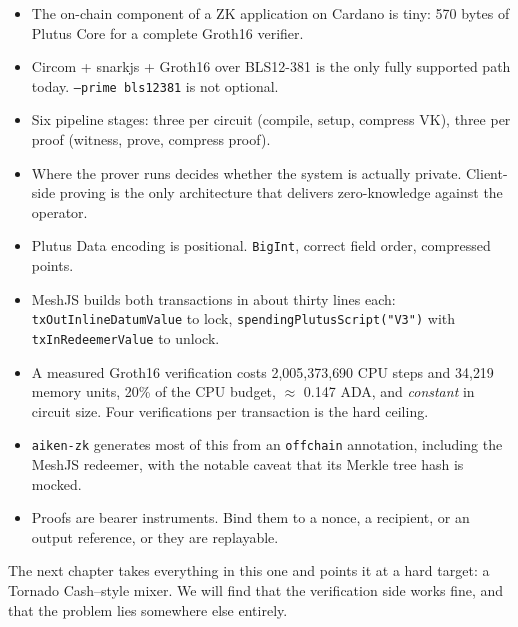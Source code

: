 \begin{itemize}
  \item The on-chain component of a ZK application on Cardano is tiny: 570
        bytes of Plutus Core for a complete Groth16 verifier.
  \item Circom + snarkjs + Groth16 over BLS12-381 is the only fully supported
        path today. \texttt{--prime bls12381} is not optional.
  \item Six pipeline stages: three per circuit (compile, setup, compress VK),
        three per proof (witness, prove, compress proof).
  \item Where the prover runs decides whether the system is actually private.
        Client-side proving is the only architecture that delivers
        zero-knowledge against the operator.
  \item Plutus Data encoding is positional. \texttt{BigInt}, correct field
        order, compressed points.
  \item MeshJS builds both transactions in about thirty lines each:
        \texttt{txOutInlineDatumValue} to lock,
        \texttt{spendingPlutusScript("V3")} with
        \texttt{txInRedeemerValue} to unlock.
  \item A measured Groth16 verification costs 2{,}005{,}373{,}690 CPU steps and
        34{,}219 memory units, 20\% of the CPU budget, $\approx$ 0.147 ADA,
        and \emph{constant} in circuit size. Four verifications per transaction
        is the hard ceiling.
  \item \texttt{aiken-zk} generates most of this from an \texttt{offchain}
        annotation, including the MeshJS redeemer, with the notable caveat
        that its Merkle tree hash is mocked.
  \item Proofs are bearer instruments. Bind them to a nonce, a recipient, or an
        output reference, or they are replayable.
\end{itemize}

The next chapter takes everything in this one and points it at a hard target: a
Tornado Cash--style mixer. We will find that the verification side works fine,
and that the problem lies somewhere else entirely.
